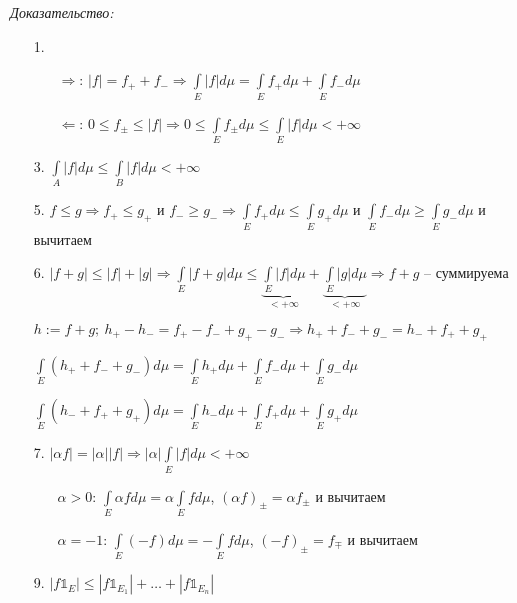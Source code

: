 \documentclass[12pt]{article}
\begin{document}
\textit{Доказательство:}

\begin{enumerate}
    \item[1.] 
    
    \begin{itemize}
        \item[$\Rightarrow$: ] $|f| = f_+ + f_- \Rightarrow \int\limits_E |f|d\mu = \int\limits_E f_+d\mu + \int\limits_E f_-d\mu$
        \item[$\Leftarrow$: ] $0 \leq f_\pm \leq |f| \Rightarrow 0 \leq \int\limits_E f_\pm d\mu \leq \int\limits_E |f|d\mu < + \infty$
    \end{itemize}

    \item[3.] $\int\limits_A |f|d\mu \leq \int\limits_B |f|d\mu < + \infty$
    \item[5.] $f \leq g \Rightarrow f_+ \leq g_+$ и $f_- \geq g_- \Rightarrow \int\limits_E f_+d\mu \leq \int\limits_E g_+d\mu$ и $\int\limits_E f_-d\mu \geq \int\limits_E g_-d\mu$ и вычитаем
    \item[6.] $|f + g| \leq |f| + |g| \Rightarrow \int\limits_E |f + g|d\mu \leq \underbrace{\int\limits_E |f|d\mu}_{< + \infty} + \underbrace{\int\limits_E |g|d\mu}_{< + \infty} \Rightarrow f + g$ -- суммируема 

        $h := f + g;\ h_+ - h_- = f_+ - f_- + g_+ - g_- \Rightarrow h_+ + f_- + g_- = h_- + f_+ + g_+$

        $\int\limits_E (h_+ + f_- + g_-)d\mu = \int\limits_E h_+d\mu + \int\limits_E f_-d\mu + \int\limits_E g_-d\mu$

        $\int\limits_E (h_- + f_+ + g_+)d\mu = \int\limits_E h_-d\mu + \int\limits_E f_+d\mu + \int\limits_E g_+d\mu$
    \item[7. ] $|\alpha f| = |\alpha||f| \Rightarrow |\alpha| \int\limits_E |f|d\mu < + \infty$

        \begin{itemize}
            \item[$\alpha > 0$: ] $\int\limits_E \alpha fd\mu = \alpha \int\limits_E fd\mu$, $(\alpha f)_\pm = \alpha f_\pm$ и вычитаем 
            \item[$\alpha = -1$: ] $\int\limits_E (-f)d\mu = -\int\limits_E fd\mu$, $(-f)_\pm = f_\mp$ и вычитаем
        \end{itemize}
    
    \item[9. ] $|f\mathbb{1}_E| \leq |f\mathbb{1}_{E_1}| + \ldots + |f\mathbb{1}_{E_n}|$
    

\end{enumerate}
\end{document}
